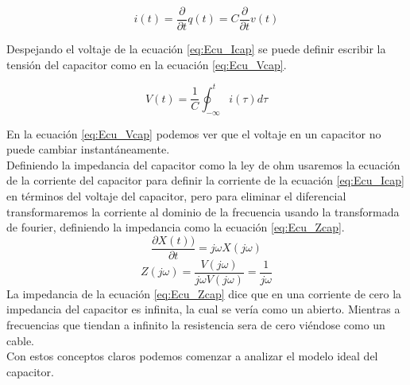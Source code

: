 \documentclass[journal]{IEEEtran}
\begin{document}
\begin{equation}
\label{eq:Ecu_Icap}
i(t)=\frac{\partial }{\partial t}q(t)=C\frac{\partial }{\partial t}v(t)
\end{equation}

Despejando el voltaje de la ecuación \ref{eq:Ecu_Icap} se puede definir escribir la tensión del capacitor como en la ecuación \ref{eq:Ecu_Vcap}.

\begin{equation}
\label{eq:Ecu_Vcap}
V(t)=\frac{1}{C}\oint_{-\infty }^{t}i(\tau )d\tau 
\end{equation}

En la ecuación \ref{eq:Ecu_Vcap} podemos ver que el voltaje en un capacitor no puede cambiar instantáneamente.\cite{dorf} \\Definiendo la impedancia del capacitor como la ley de ohm usaremos la ecuación de la corriente del capacitor para definir la corriente de la ecuación \ref{eq:Ecu_Icap} en términos del voltaje del capacitor, pero para eliminar el diferencial transformaremos la corriente al dominio de la frecuencia usando la transformada de fourier, definiendo la impedancia como la ecuación \ref{eq:Ecu_Zcap}.
\[\frac{\partial X(t))}{\partial t}=j\omega X(j\omega )\] \cite{modelos}
\begin{equation}
\label{eq:Ecu_Zcap} 
Z(j\omega )=\frac{V(j\omega )}{j\omega V(j\omega )}=\frac{1}{j\omega }
\end{equation} 
La impedancia de la ecuación \ref{eq:Ecu_Zcap} dice que en una corriente de cero la impedancia del capacitor es infinita, la cual se vería como un abierto. Mientras a frecuencias que tiendan a infinito la resistencia sera de cero viéndose como un cable.\\ Con estos conceptos claros podemos comenzar a analizar el modelo ideal del capacitor.
 
\end{document}
